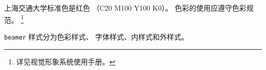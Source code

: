 \documentclass{ctexbeamer}
\begin{document}
\begin{frame}
  上海交通大学标准色是红色
  （C20 M100 Y100 K0）。
  色彩的使用应遵守色彩规范。
  \footnote{详见视觉形象系统使用手册。}

  \texttt{beamer} 样式分为色彩样式、
  字体样式、内样式和外样式。
\end{frame}
\end{document}
